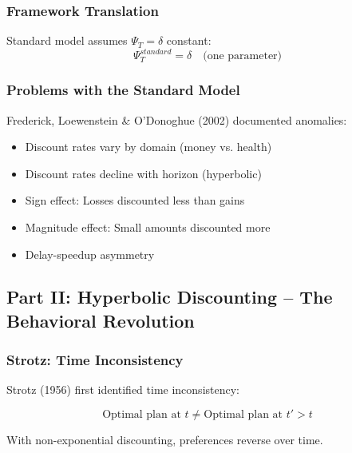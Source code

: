 \subsubsection{Framework Translation}

Standard model assumes $\Psi_T = \delta$ constant:
\begin{equation}
\Psi_T^{standard} = \delta \quad \text{(one parameter)}
\end{equation}

\subsubsection{Problems with the Standard Model}

Frederick, Loewenstein \& O'Donoghue (2002) documented anomalies:
\begin{itemize}
    \item Discount rates vary by domain (money vs. health)
    \item Discount rates decline with horizon (hyperbolic)
    \item Sign effect: Losses discounted less than gains
    \item Magnitude effect: Small amounts discounted more
    \item Delay-speedup asymmetry
\end{itemize}

\subsection{Part II: Hyperbolic Discounting – The Behavioral Revolution}

\subsubsection{Strotz: Time Inconsistency}

Strotz (1956) first identified time inconsistency:

\begin{equation}
\boxed{
\text{Optimal plan at } t \neq \text{Optimal plan at } t' > t
}
\label{eq:strotz}
\end{equation}

With non-exponential discounting, preferences reverse over time.

